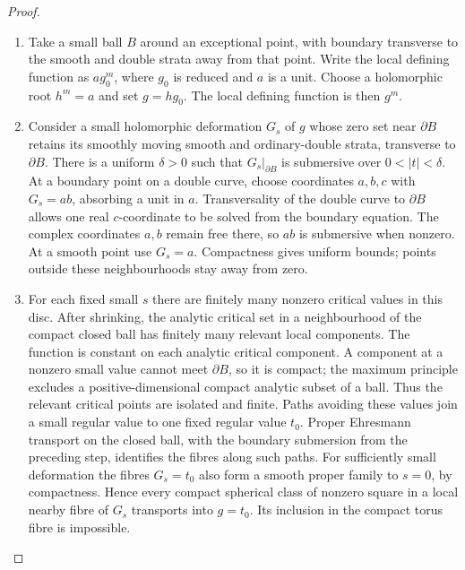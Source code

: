 \begin{proof}

\begin{enumerate}[label={$\langle1\rangle$\arabic*.},leftmargin=*]
\item Take a small ball $B$ around an exceptional point, with
boundary transverse to the smooth and double strata away
from that point. Write the local defining function as $a g_0^m$,
where $g_0$ is reduced and $a$ is a unit. Choose a holomorphic
root $h^m=a$ and set $g=h g_0$. The local defining function
is then $g^m$.

\item Consider a small holomorphic deformation $G_s$ of $g$ whose
zero set near $\partial B$ retains its smoothly moving smooth
and ordinary-double strata, transverse to $\partial B$.
There is a uniform $\delta>0$ such that
$G_s|_{\partial B}$ is submersive over $0<|t|<\delta$.
At a boundary point on a double curve, choose coordinates
$a,b,c$ with $G_s=ab$, absorbing a unit in $a$.
Transversality of the double curve to $\partial B$ allows one
real $c$-coordinate to be solved from the boundary equation.
The complex coordinates $a,b$ remain free there, so $ab$ is
submersive when nonzero. At a smooth point use $G_s=a$.
Compactness gives uniform bounds; points outside these
neighbourhoods stay away from zero.

\item For each fixed small $s$ there are finitely many nonzero
critical values in this disc. After shrinking, the analytic
critical set in a neighbourhood of the compact closed ball
has finitely many relevant local components. The function is constant on
each analytic critical component. A component at a nonzero
small value cannot meet $\partial B$, so it is compact;
the maximum principle excludes a positive-dimensional
compact analytic subset of a ball. Thus the relevant critical
points are isolated and finite. Paths avoiding these values
join a small regular value to one fixed regular value $t_0$.
Proper Ehresmann transport on the closed ball, with the
boundary submersion from the preceding step, identifies the fibres along
such paths. For sufficiently small deformation the fibres
$G_s=t_0$ also form a smooth proper family to $s=0$, by
compactness. Hence every compact spherical class of nonzero
square in a local nearby fibre of $G_s$ transports into
$g=t_0$. Its inclusion in the compact torus fibre is impossible.


\end{enumerate}
\end{proof}
